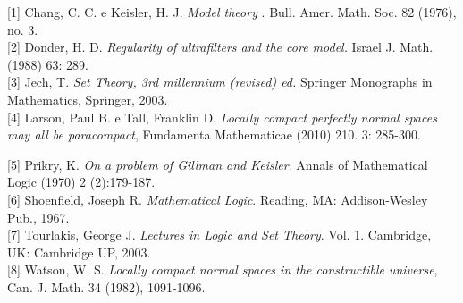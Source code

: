 \documentclass[11pt,a4paper]{article}
\theoremstyle{definition}
\begin{document}
[1] Chang, C. C. e Keisler, H. J. \textit{Model theory} . Bull. Amer. Math. Soc. 82 (1976), no. 3. \\

[2] Donder, H. D.  \textit{Regularity of ultrafilters and the core model.} Israel J. Math. (1988) 63: 289. \\

[3] Jech, T. \textit{Set Theory, 3rd millennium (revised) ed.} Springer Monographs in Mathematics, Springer, 2003. \\

[4] Larson, Paul B. e Tall, Franklin D. \textit{Locally compact perfectly normal spaces may all be paracompact}, Fundamenta Mathematicae (2010)  210. 3: 285-300.

[5] Prikry, K.  \textit{On a problem of Gillman and Keisler}. Annals of Mathematical Logic  (1970) 2 (2):179-187. \\

[6] Shoenfield, Joseph R. \textit{Mathematical Logic}. Reading, MA: Addison-Wesley Pub., 1967.  \\

[7] Tourlakis, George J. \textit{Lectures in Logic and Set Theory}. Vol. 1. Cambridge, UK: Cambridge UP, 2003.  \\

[8] Watson, W. S. \textit{Locally compact normal spaces in the constructible universe}, Can. J. Math. 34 (1982),
1091-1096.

 
\end{document}
